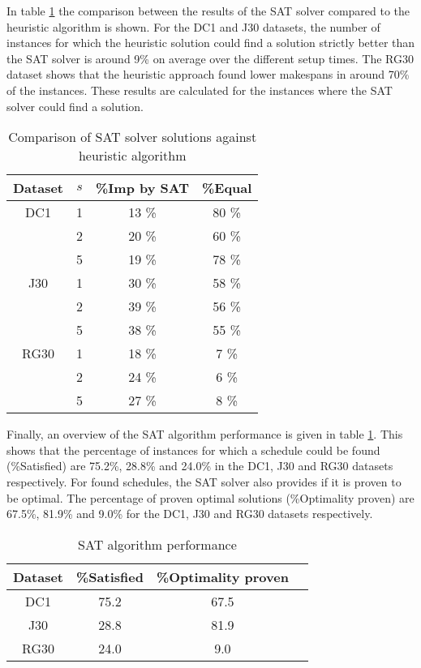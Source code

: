 In table \ref{table:table5} the comparison between the results of the SAT solver compared to the heuristic algorithm is shown. For the DC1 and J30 datasets, the number of instances for which the heuristic solution could find a solution strictly better than the SAT solver is around 9\% on average over the different setup times. The RG30 dataset shows that the heuristic approach found lower makespans in around 70\% of the instances. These results are calculated for the instances where the SAT solver could find a solution.

\begin{table}
	\begin{center}
		\caption{Comparison of SAT solver solutions against heuristic algorithm}
		\label{table:table5}
		\begin{tabular}{ c | c c c }
			Dataset & \(s\) & \%Imp by SAT & \%Equal \\
			\hline
			DC1 & 1 & 13 \% & 80 \% \\ 
			  	& 2 & 20 \% & 60 \%\\  
			  	& 5 & 19 \% & 78 \%\\ 
			J30 & 1 & 30 \% & 58 \%\\ 
			  	& 2 & 39 \% & 56 \%\\  
			  	& 5 & 38 \% & 55 \%\\ 
			RG30 & 1 & 18 \% & 7 \%\\ 
			 	 & 2 & 24 \% & 6 \%\\  
			 	 & 5 & 27 \% & 8 \%
		\end{tabular}
	\end{center}
\end{table}

Finally, an overview of the SAT algorithm performance is given in table \ref{table:table5}. This shows that the percentage of instances for which a schedule could be found (\%Satisfied) are 75.2\%, 28.8\% and 24.0\% in the DC1, J30 and RG30 datasets respectively. For found schedules, the SAT solver also provides if it is proven to be optimal. The percentage of proven optimal solutions (\%Optimality proven) are 67.5\%, 81.9\% and 9.0\% for the DC1, J30 and RG30 datasets respectively.

\begin{table}
	\begin{center}
		\caption{SAT algorithm performance}
		\label{table:table6}
		\begin{tabular}{ c | c c c }
			Dataset & \%Satisfied & \%Optimality proven \\
			\hline
			DC1 & 75.2 & 67.5 \\
			J30 & 28.8 & 81.9 \\ 
			RG30 & 24.0 & 9.0
		\end{tabular}
	\end{center}
\end{table}



